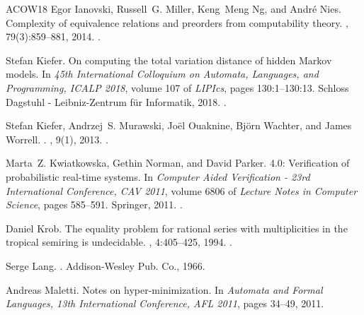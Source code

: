\documentclass[10pt,a4paper]{amsart}
\numberwithin{equation}{section}
\theoremstyle{plain}
\theoremstyle{definition}
\theoremstyle{remark}
\begin{document}
\begin{thebibliography}{ACOW18}
Egor Ianovski, Russell~G. Miller, Keng~Meng Ng, and Andr{\'{e}} Nies.
\newblock Complexity of equivalence relations and preorders from computability
  theory.
, 79(3):859--881, 2014.
\newblock \href {https://doi.org/10.1017/jsl.2013.33}
  {}.

Stefan Kiefer.
\newblock On computing the total variation distance of hidden {M}arkov models.
\newblock In {\em 45th International Colloquium on Automata, Languages, and
  Programming, {ICALP} 2018}, volume 107 of {\em LIPIcs}, pages 130:1--130:13.
  Schloss Dagstuhl - Leibniz-Zentrum f{\"{u}}r Informatik, 2018.
\newblock \href {https://doi.org/10.4230/LIPIcs.ICALP.2018.130}
  {}.

Stefan Kiefer, Andrzej~S. Murawski, Jo{\"{e}}l Ouaknine, Bj{\"{o}}rn Wachter,
  and James Worrell.
.
, 9(1), 2013.
\newblock \href {https://doi.org/10.2168/LMCS-9(1:8)2013}
  {}.

Marta~Z. Kwiatkowska, Gethin Norman, and David Parker.
 4.0: Verification of probabilistic real-time systems.
\newblock In {\em Computer Aided Verification - 23rd International Conference,
  {CAV} 2011}, volume 6806 of {\em Lecture Notes in Computer Science}, pages
  585--591. Springer, 2011.
\newblock \href {https://doi.org/10.1007/978-3-642-22110-1_47}
  {}.

Daniel Krob.
\newblock The equality problem for rational series with multiplicities in the
  tropical semiring is undecidable.
, 4:405--425,
  1994.
\newblock \href {https://doi.org/10.1142/S0218196794000063}
  {}.

Serge Lang.
.
\newblock Addison-Wesley Pub. Co., 1966.

Andreas Maletti.
\newblock Notes on hyper-minimization.
\newblock In {\em Automata and Formal Languages, 13th International Conference,
  {AFL} 2011}, pages 34--49, 2011.


\end{thebibliography}
\end{document}
